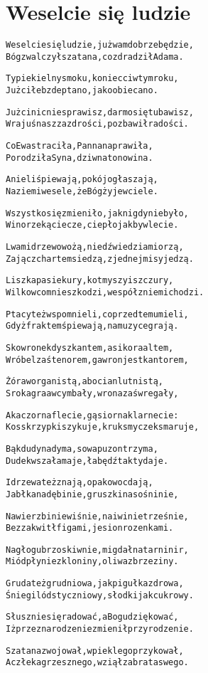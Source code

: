 \documentclass[a4paper,12pt]{article}
\begin{document}
\section*{Weselcie się ludzie}
\begin{alltt}
Weselcie się ludzie, już wam dobrze będzie,
Bóg zwalczył szatana, co zdradził Adama.

Ty piekielny smoku, koniec ci w tym roku,
Już ci łeb zdeptano, jako obiecano.

Jużci nic nie sprawisz, darmo się tu bawisz,
W rajuś nas z zazdrości, pozbawił radości.

Co Ewa straciła, Panna naprawiła,
Porodziła Syna, dziwna to nowina.

Anieli śpiewają, pokój ogłaszają,
Na ziemi wesele, że Bóg żyje w ciele.

Wszystko się zmieniło, jak nigdy nie było,
Wino rzeką ciecze, ciepło jakby w lecie.

Lwami drzewo wożą, niedźwiedziami orzą,
Zając z chartem siedzą, z jednej misy jedzą.

Liszka pasie kury, kot myszy i szczury,
Wilk owcom nie szkodzi, wespół z niemi chodzi.

Ptacy też wspomnieli, co przedtem umieli,
Gdyż fraktem śpiewają, na muzyce grają.

Skowronek dyszkantem, a sikora altem,
Wróbel zaś tenorem, gawron jest kantorem,

Żóraw organistą, a bocian lutnistą,
Sroka graa w cymbały, wrona zaś w regały,

A kaczor na flecie, gąsior na klarnecie:
Kos skrzypki szykuje, kruk smyczek smaruje,

Bąk dudy nadyma, sowa puzon trzyma,
Dudek w szałamaje, łabędź takty daje.

I drzewa też znają, opak owoc dają,
Jabłka na dębinie, gruszki na sośninie,

Na wierzbinie wiśnie, na iwinie trześnie,
Bez zakwitł figami, jesion rozenkami.

Na głogu brzoskiwnie, migdał na tarninir,
Miód płynie z kloniny, oliwa z brzeziny.

Gruda też grudniowa, jak pigułka zdrowa,
Śnieg i lód styczniowy, słodki jak cukrowy.

Słusznie się radować, a Bogu dziękować,
Iż przez narodzenie zmienił przyrodzenie.

Szatana zwojował, w piekle go przykował,
A człeka grzesznego, wziął za brata swego.
\end{alltt}
\end{document}
